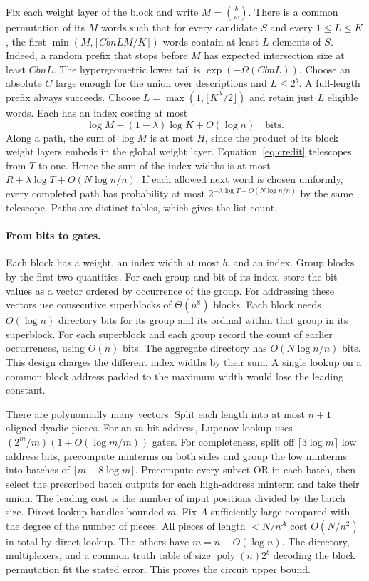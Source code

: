 \documentclass[11pt]{article}
\begin{document}
Fix each weight layer of the block and write $M=\binom bw$. There is a common permutation of its $M$ words such that for every candidate $S$ and every $1\le L\le K$, the first $\min(M,\lceil CbnLM/K\rceil)$ words contain at least $L$ elements of $S$. Indeed, a random prefix that stops before $M$ has expected intersection size at least $CbnL$. The hypergeometric lower tail is $\exp(-\Omega(CbnL))$. Choose an absolute $C$ large enough for the union over descriptions and $L\le2^b$. A full-length prefix always succeeds. Choose $L=\max(1,\lfloor K^\lambda/2\rfloor)$ and retain just $L$ eligible words. Each has an index costing at most
\[
 \log M-(1-\lambda)\log K+O(\log n)\quad\text{bits}.
\]
Along a path, the sum of $\log M$ is at most $H$, since the product of its block weight layers embeds in the global weight layer. Equation~\eqref{eq:credit} telescopes from $T$ to one. Hence the sum of the index widths is at most $R+\lambda\log T+O(N\log n/n)$. If each allowed next word is chosen uniformly, every completed path has probability at most $2^{-\lambda\log T+O(N\log n/n)}$ by the same telescope. Paths are distinct tables, which gives the list count.

\paragraph{From bits to gates.} Each block has a weight, an index width at most $b$, and an index. Group blocks by the first two quantities. For each group and bit of its index, store the bit values as a vector ordered by occurrence of the group. For addressing these vectors use consecutive superblocks of $\Theta(n^8)$ blocks. Each block needs $O(\log n)$ directory bits for its group and its ordinal within that group in its superblock. For each superblock and each group record the count of earlier occurrences, using $O(n)$ bits. The aggregate directory has $O(N\log n/n)$ bits. This design charges the different index widths by their sum. A single lookup on a common block address padded to the maximum width would lose the leading constant.

There are polynomially many vectors. Split each length into at most $n+1$ aligned dyadic pieces. For an $m$-bit address, Lupanov lookup uses $(2^m/m)(1+O(\log m/m))$ gates. For completeness, split off $\lceil3\log m\rceil$ low address bits, precompute minterms on both sides and group the low minterms into batches of $\lfloor m-8\log m\rfloor$. Precompute every subset OR in each batch, then select the prescribed batch outputs for each high-address minterm and take their union. The leading cost is the number of input positions divided by the batch size. Direct lookup handles bounded $m$. Fix $A$ sufficiently large compared with the degree of the number of pieces. All pieces of length $<N/n^A$ cost $O(N/n^2)$ in total by direct lookup. The others have $m=n-O(\log n)$. The directory, multiplexers, and a common truth table of size $\operatorname{poly}(n)2^b$ decoding the block permutation fit the stated error. This proves the circuit upper bound.
\end{document}
